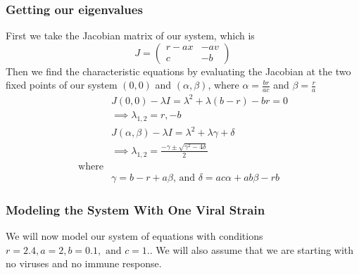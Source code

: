 \documentclass{article}
\begin{document}
\subsubsection{Getting our eigenvalues}
First we take the Jacobian matrix of our system, which is
\begin{equation}
    J =
    \begin{pmatrix}
        r-ax    & -av \\
        c       & -b
    \end{pmatrix}
\end{equation}
Then we find the characteristic equations by evaluating the Jacobian at the two fixed points of our system $(0,0)$ and $(\alpha,\beta)$, where $\alpha = \frac{br}{ac} $ and $\beta = \frac{r}{a} $
\begin{equation}
    \begin{split}
        &J(0,0) - \lambda I = \lambda^2 + \lambda(b-r) -br = 0\\
        &\implies \lambda_{1,2} = r,-b\\
        &J(\alpha,\beta)  - \lambda I =  \lambda^2 + \lambda \gamma + \delta\\ 
        &\implies \lambda_{1,2} = \frac{-\gamma \pm \sqrt{\gamma^2 - 4\delta}}{2} \\
        \text{where} \\
        &\gamma =  b - r + a\beta \text{, and } \delta = ac\alpha + ab\beta -rb
    \end{split}
\end{equation}
\subsubsection{Modeling the System With One Viral Strain}
We will now model our system of equations with conditions $r = 2.4, a = 2, b = 0.1, \text{ and }c = 1.$. We will also assume that we are starting with no viruses and no immune response.
\label{sub:modeling the sytem}
\end{document}
